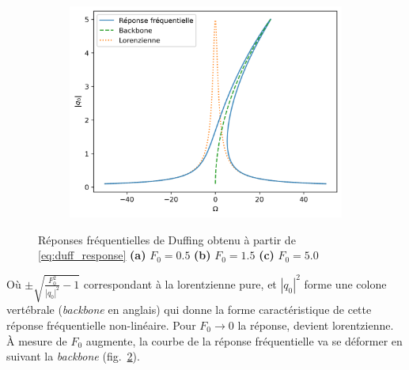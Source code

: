 \begin{figure}[t]
\begin{subfigure}[b]{0.31\textwidth}
        \includegraphics[width=\textwidth]{images/duffing/notitle_F0=5.0.png}
        \caption{}\label{fig:duffing_response_3}
    \end{subfigure} 
    \caption{Réponses fréquentielles de Duffing obtenu à partir de \eqref{eq:duff_response} \textbf{(a)} $F_0=0.5$ \textbf{(b)} $F_0=1.5$ \textbf{(c)} $F_0=5.0$}\label{fig:duffing_response_all}
\end{figure}
Où $\pm \sqrt{\frac{F_0^2}{|q_0|^2} - 1 }$ correspondant à la lorentzienne pure, et $|q_0|^2$ forme 
une colone vertébrale (\emph{backbone} en anglais) qui donne la forme caractéristique de cette réponse fréquentielle non-linéaire.
%
Pour $F_0 \to 0$ la réponse, devient lorentzienne. À mesure de $F_0$ augmente, la courbe de la réponse fréquentielle va 
se déformer en suivant la \emph{backbone} (fig.~\ref{fig:duffing_response_all}).


